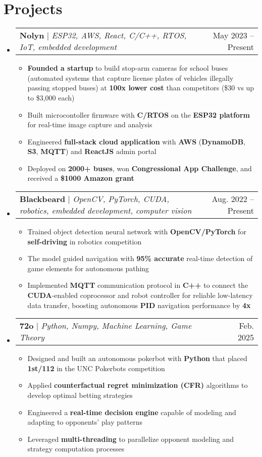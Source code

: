 \documentclass[letterpaper,11pt]{article}
\makeatletter
\newcommand{\resumeItem}[1]{
  \item\small{
    {#1 \vspace{-2pt}}}
}
\newcommand{\resumeProjectHeading}[2]{
    \item
    \begin{tabular*}{0.97\textwidth}{l@{\extracolsep{\fill}}r}
      \small#1 & #2 \\
    \end{tabular*}\vspace{-7pt}
}
\newcommand{\resumeSubHeadingListStart}{\begin{itemize}[leftmargin=0.15in, label={}]}
\newcommand{\resumeSubHeadingListEnd}{\end{itemize}}
\newcommand{\resumeItemListStart}{\begin{itemize}}
\newcommand{\resumeItemListEnd}{\end{itemize}\vspace{-5pt}}
\makeatother
\begin{document}
\section{Projects}
    \resumeSubHeadingListStart
      \resumeProjectHeading
          {\textbf{Nolyn} $|$ \emph{ESP32, AWS, React, C/C++, RTOS, IoT, embedded development}}{May 2023 -- Present}
          \resumeItemListStart
            \resumeItem{\textbf{Founded a startup} to build stop-arm cameras for school buses (automated systems that capture license plates of vehicles illegally passing stopped buses) at \textbf{100x lower cost} than competitors (\$30 vs up to \$3,000 each)}
            \resumeItem{Built microcontoller firmware with \textbf{C/RTOS} on the \textbf{ESP32 platform} for real-time image capture and analysis}
            \resumeItem{Engineered \textbf{full-stack cloud application} with \textbf{AWS} (\textbf{DynamoDB}, \textbf{S3}, \textbf{MQTT}) and \textbf{ReactJS} admin portal}
            \resumeItem{Deployed on \textbf{2000+ buses}, won \textbf{Congressional App Challenge}, and received a \textbf{\$1000 Amazon grant}}
          \resumeItemListEnd
      \vspace{-4pt}
      \resumeProjectHeading
        {\textbf{Blackbeard} $|$ \emph{OpenCV, PyTorch, CUDA, robotics, embedded development, computer vision}}{Aug. 2022 -- Present}
        \resumeItemListStart
          \resumeItem{Trained object detection neural network with \textbf{OpenCV/PyTorch} for \textbf{self-driving} in robotics competition}
          \resumeItem{The model guided navigation with \textbf{95\% accurate} real-time detection of game elements for autonomous pathing}
          \resumeItem{Implemented \textbf{MQTT} communication protocol in \textbf{C++} to connect the \textbf{CUDA}-enabled coprocessor and robot controller for reliable low-latency data transfer, boosting autonomous \textbf{PID} navigation performance by \textbf{4x}}
        \resumeItemListEnd
        \vspace{-4pt}
        \resumeProjectHeading
          {\textbf{72o} $|$ \emph{Python, Numpy, Machine Learning, Game Theory}}{Feb. 2025}
          \resumeItemListStart
            \resumeItem{Designed and built an autonomous pokerbot with \textbf{Python} that placed \textbf{1st/112} in the UNC Pokerbots competition}
            \resumeItem{Applied \textbf{counterfactual regret minimization (CFR)} algorithms to develop optimal betting strategies}
            \resumeItem{Engineered a \textbf{real-time decision engine} capable of modeling and adapting to opponents' play patterns}
            \resumeItem{Leveraged \textbf{multi-threading} to parallelize opponent modeling and strategy computation processes}
          \resumeItemListEnd
    \resumeSubHeadingListEnd
\end{document}
